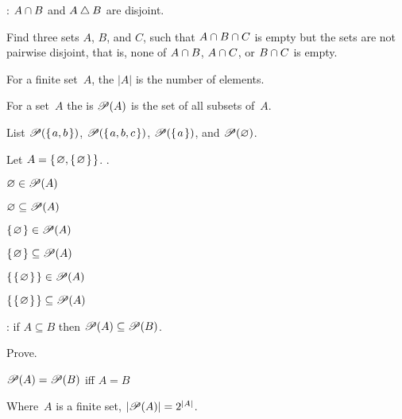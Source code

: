 \documentclass{ibl}
\begin{document}
\begin{ex}
\begin{exes}
\item \pord: $A\cap B$ and $A\mathbin{\triangle} B$ are disjoint.  
\item Find three sets $A$, $B$, and $C$, such that 
$A\cap B\cap C$ is empty but the sets are
not pairwise disjoint, that is, none of $A\cap B$, 
$A\cap C$, or $B\cap C$ is empty. 
\end{exes}
\end{ex}

\begin{df}
For a finite set~$A$, the  $|A|$ is the number of elements.
\end{df}


\begin{df}
For a set~$A$ the  is $\mathscr{P}(A)$ is the set of all
subsets of~$A$.
\end{df}

\begin{ex} List 
 $\mathscr{P}(\mbox{$\{\hspace{0.1em}a,b\hspace{0.1em}\}$})$,   
 $\mathscr{P}(\mbox{$\{\hspace{0.1em}a,b,c\hspace{0.1em}\}$})$,   
 $\mathscr{P}(\mbox{$\{\hspace{0.1em}a\hspace{0.1em}\}$})$, and   
 $\mathscr{P}(\varnothing)$.   
\end{ex}

\begin{ex}  Let $A=\mbox{$\{\hspace{0.1em}\varnothing,\mbox{$\{\hspace{0.1em}\varnothing\hspace{0.1em}\}$}\hspace{0.1em}\}$}$. \pord.
\begin{exes}
\item $\varnothing\in\mathscr{P}(A)$    
\item $\varnothing\subseteq\mathscr{P}(A)$    
\item $\mbox{$\{\hspace{0.1em}\varnothing\hspace{0.1em}\}$}\in\mathscr{P}(A)$    
\item $\mbox{$\{\hspace{0.1em}\varnothing\hspace{0.1em}\}$}\subseteq\mathscr{P}(A)$    
\item $\mbox{$\{\hspace{0.1em}\mbox{$\{\hspace{0.1em}\varnothing\hspace{0.1em}\}$}\hspace{0.1em}\}$}\in\mathscr{P}(A)$    
\item $\mbox{$\{\hspace{0.1em}\mbox{$\{\hspace{0.1em}\varnothing\hspace{0.1em}\}$}\hspace{0.1em}\}$}\subseteq\mathscr{P}(A)$    
\end{exes}
\end{ex}

\begin{ex} \pord:
if $A\subseteq B$ then $\mathscr{P}(A)\subseteq\mathscr{P}(B)$.  
\end{ex}

\begin{ex} Prove.
\begin{exes}
\item $\mathscr{P}(A)=\mathscr{P}(B)$ iff $A= B$  
\item Where~$A$ is a finite set, $|\mathscr{P}(A)|=2^{|A|}$.    
\end{exes}
\end{ex}
\end{document}
